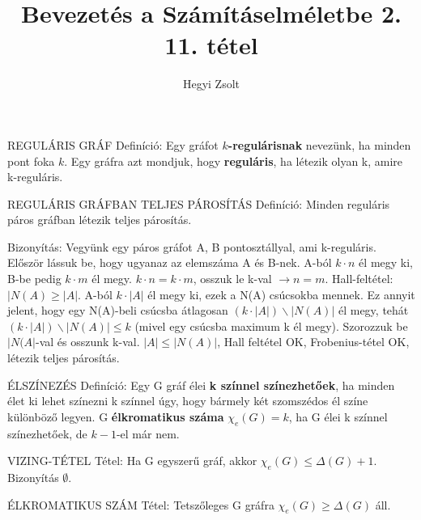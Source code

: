 \documentclass[]{article}
\title{Bevezetés a Számításelméletbe 2.\\{\large 11. tétel}}
\author{Hegyi Zsolt}
\begin{document}
\maketitle
\begin{shaded}
REGULÁRIS GRÁF Definíció: Egy gráfot \textbf{$k$-regulárisnak} nevezünk, ha minden pont foka $k$. Egy gráfra azt mondjuk, hogy \textbf{reguláris}, ha létezik olyan k, amire k-reguláris.
\end{shaded}
\begin{framed}
REGULÁRIS GRÁFBAN TELJES PÁROSÍTÁS Definíció: Minden reguláris páros gráfban létezik teljes párosítás.
\end{framed}
\begin{leftbar}
Bizonyítás:
Vegyünk egy páros gráfot A, B pontosztállyal, ami k-reguláris. Először lássuk be, hogy ugyanaz az elemszáma A és B-nek. A-ból $k\cdot n$ él megy ki, B-be pedig $k \cdot m$ él megy. $k\cdot n = k\cdot m$, osszuk le k-val $\rightarrow n = m$. Hall-feltétel: $|N(A) \geq |A|$. A-ból $k\cdot|A|$ él megy ki, ezek a N(A) csúcsokba mennek. Ez annyit jelent, hogy egy N(A)-beli csúcsba átlagosan $(k\cdot |A|) \backslash |N(A)|$ él megy, tehát $(k\cdot |A|) \backslash |N(A)| \leq k$ (mivel egy csúcsba maximum k él megy). Szorozzuk be $|N(A|$-val és osszunk k-val. $|A| \leq |N(A)|$, Hall feltétel OK, Frobenius-tétel OK, létezik teljes párosítás.
\end{leftbar}
\begin{shaded}
ÉLSZÍNEZÉS Definíció: Egy G gráf élei \textbf{k színnel színezhetőek}, ha minden élet ki lehet színezni k színnel úgy, hogy bármely két szomszédos él színe különböző legyen. G \textbf{élkromatikus száma} $\chi_e(G) = k$, ha G élei k színnel színezhetőek, de $k - 1$-el már nem.
\end{shaded}
\begin{framed}
VIZING-TÉTEL Tétel: Ha G egyszerű gráf, akkor $\chi_e(G) \leq \Delta(G) + 1$. Bizonyítás $\emptyset$.
\end{framed}
\begin{framed}
ÉLKROMATIKUS SZÁM Tétel: Tetszőleges G gráfra $\chi_e(G) \geq \Delta(G)$ áll.
\end{framed}
\end{document}
